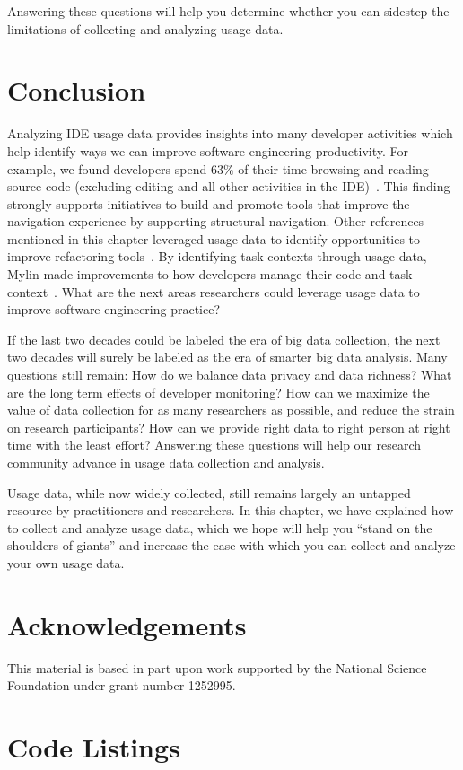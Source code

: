 \documentclass{book}
\begin{document}
\noindent
Answering these questions will help you determine whether you can sidestep
the limitations of collecting and analyzing usage data.

\section{Conclusion}

Analyzing IDE usage data provides insights into many developer activities which help identify ways we can improve software engineering productivity.  For example, we found developers spend 63\% of their time browsing and reading source code (excluding editing and all other activities in the IDE)~\cite{SnipesExperiencesGamifyingSoftwareDevelopment}.  This finding strongly supports initiatives to build and promote tools that improve the navigation experience by supporting structural navigation.  Other references mentioned in this chapter leveraged usage data to identify opportunities to improve refactoring tools~\cite{VakilianJohnson2014Alternate,MurphyHill2012Improving}.  By identifying task contexts through usage data, Mylin made improvements to how developers manage their code and task context~\cite{Kersten-Mylyn}.  What are the next areas researchers could leverage usage data to improve software engineering practice?

If the last two decades could be labeled the era
of big data collection,
the next two decades will surely be labeled as the
era of smarter big data analysis.
Many questions still remain:
How do we balance data privacy and data richness?
What are the long term effects of developer monitoring?
How can we maximize the value of data collection
for as many researchers as possible, and reduce the
strain on research participants? How can we provide right data to right person at right time with the least effort?
Answering these questions will help our research
community advance in usage data collection and analysis.

Usage data, while now widely collected, still remains largely
an untapped resource by practitioners and researchers.
In this chapter, we have explained how to collect and
analyze usage data, which we hope will help you ``stand
on the shoulders of giants'' and increase the ease
with which you can collect and analyze your own usage data.


\section{Acknowledgements}

This material is based in part upon work supported by the National 
Science Foundation under grant number 1252995.

\section{Code Listings}



 
\end{document}
